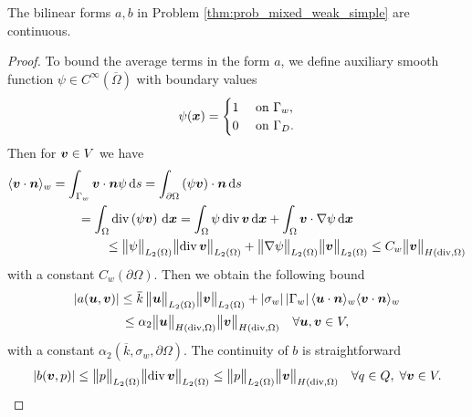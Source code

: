 \begin{lemma} \label{lem:mixed_continuity_ab}
The bilinear forms $a,b$ in Problem \ref{thm:prob_mixed_weak_simple} are continuous.
\end{lemma}
\begin{proof}
To bound the average terms in the form $a$,
we define auxiliary smooth function $\psi\in C^{\infty}(\overbar\Omega)$ with boundary values
\begin{equation*}
  \psi(\mathbf{\boldsymbol{x}}) =
  \begin{cases}
    1 & \textrm{ on } \Gamma_w, \\
    0 & \textrm{ on } \Gamma_D.
  \end{cases} \nonumber
\end{equation*}
Then for $\mathbf{\boldsymbol{v}}\in V$ we have
\begin{align*}
  \langle\mathbf{\boldsymbol{v}} \cdot\mathbf{\boldsymbol{n}}\rangle_w = \int_{\Gamma_w} \mathbf{\boldsymbol{v}} \cdot\mathbf{\boldsymbol{n}} \psi \,{\rm d} s = 
    \int_{\partial\Omega} \left( \psi \mathbf{\boldsymbol{v}} \right) \cdot\mathbf{\boldsymbol{n}} \,{\rm d} s & \\
    = \int_{\Omega} {\rm div}\left( \psi \mathbf{\boldsymbol{v}} \right) \,{\rm d}\mathbf{\boldsymbol{x}}
    = \int_{\Omega} \psi\, {\rm div}\, &\mathbf{\boldsymbol{v}} \,{\rm d}\mathbf{\boldsymbol{x}} + \int_{\Omega} \mathbf{\boldsymbol{v}} \cdot \nabla\psi \,{\rm d}\mathbf{\boldsymbol{x}} \\
    \leq \bigl\Vert\psi\bigr\Vert_{L_2(\Omega)} \bigl\Vert{\rm div}\,\mathbf{\boldsymbol{v}}\bigr\Vert_{L_2(\Omega)}& + \bigl\Vert\nabla\psi\bigr\Vert_{L_2(\Omega)} \bigl\Vert\mathbf{\boldsymbol{v}}\bigr\Vert_{L_2(\Omega)}
    \leq C_w \bigl\Vert\mathbf{\boldsymbol{v}}\bigr\Vert_{H({\rm div},\Omega)}
\end{align*}
with a constant $C_w(\partial\Omega)$. Then we obtain the following bound
\begin{multline} \label{eqn:form_a_bound}
    \abs{a(\vc u,\vc v)} \leq \overbar{k}\, \norm{\vc u}_{L_2(\Omega)} \norm{\vc v}_{L_2(\Omega)}
        + \abs{\sigma_w} \abs{\Gamma_w} \avg{\vc u\cdot\vc n}_w \avg{\vc v\cdot\vc n}_w\\
        \leq \alpha_2 \norm{\vc u}_{H(\div,\Omega)} \norm{\vc v}_{H(\div,\Omega)} \quad \forall \vc u,\vc v\in V,
\end{multline}
with a constant $\alpha_2 \left(\overbar{k}, \sigma_w, \partial\Omega\right)$.
The continuity of $b$ is straightforward
\begin{equation} \label{eqn:form_b_bound}
    \left|b(\mathbf{\boldsymbol{v}},p)\right| \leq \bigl\Vert p\bigr\Vert_{L_2(\Omega)} \bigl\Vert{\rm div}\,\mathbf{\boldsymbol{v}}\bigr\Vert_{L_2(\Omega)}
        \leq \bigl\Vert p\bigr\Vert_{L_2(\Omega)} \bigl\Vert\mathbf{\boldsymbol{v}}\bigr\Vert_{H({\rm div},\Omega)} \quad \forall q\in Q,\;\forall \mathbf{\boldsymbol{v}}\in V.
\end{equation}
\end{proof}

